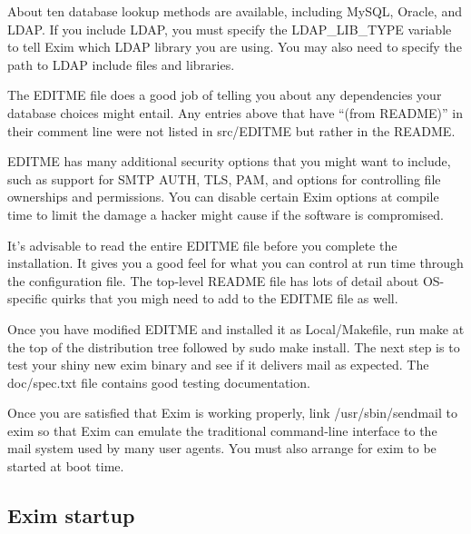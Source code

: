 About ten
dat\protect\hypertarget{part0026_split_041.htmlux5cux23_idTextAnchor1128}{}{}abase
lookup methods are available, including MySQL, Oracle, and LDAP. If you
include LDAP, you must specify the {LDAP\_LIB\_TYPE} variable to tell
Exim which LDAP library you are using. You may also need to specify the
path to LDAP include files and libraries.

The {EDITME} file does a good job of telling you about any dependencies
your database choices might entail. Any entries above that have ``(from
README)'' in their comment line were not listed in {src/EDITME} but
rather in the {README}.

\protect\hypertarget{part0026_split_041.htmlux5cux23_idIndexMarker2617}{}{}\protect\hypertarget{part0026_split_041.htmlux5cux23_idIndexMarker2618}{}{}{EDITME}
has many additional security options that you might want to include,
such as support for SMTP AUTH, TLS, PAM, and options for controlling
file ownerships and permissions. You can disable certain Exim options at
compile time to limit the damage a hacker might cause if the software is
compromised.

It's advisable to read the entire {EDITME} file before you complete the
installation. It gives you a good feel for what you can control at run
time through the configuration file. The top-level {README} file has
lots of detail about OS-specific quirks that you migh need to add to the
{EDITME} file as well.

Once you have modified {EDITME} and installed it as {Local/Makefile},
run {make} at the top of the distribution tree followed by {sudo make
install}. The next step is to test your shiny new {exim} binary and see
if it delivers mail as expected. The {doc/spec.txt} file contains good
testing documentation.

Once you are satisfied that Exim is working properly, link
{/usr/sbin/sendmail} to
\protect\hypertarget{part0026_split_041.htmlux5cux23_idIndexMarker2619}{}{}{exim}
so that Exim can emulate the traditional command-line interface to the
mail system used by many user agents. You must also arrange for {exim}
to be started at boot time.

\protect\hypertarget{part0026_split_042.html}{}{}

\hypertarget{part0026_split_042.htmlux5cux23_idContainer1247}{}
\hypertarget{part0026_split_042.htmlux5cux23calibre_pb_41}{%
\subsection[Exim
startup]{\texorpdfstring{\protect\hypertarget{part0026_split_042.htmlux5cux23_idTextAnchor1129}{}{}Exim
startup}{Exim startup}}\label{part0026_split_042.htmlux5cux23calibre_pb_41}}

